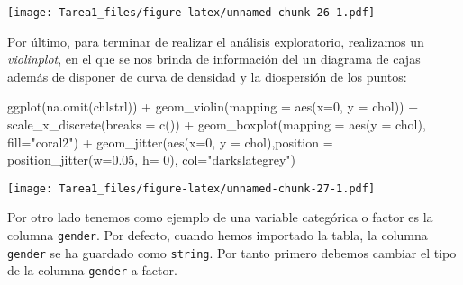 \documentclass[
]{article}
\newenvironment{Shaded}{\begin{snugshade}}{\end{snugshade}}
\newcommand{\AttributeTok}[1]{\textcolor[rgb]{0.77,0.63,0.00}{#1}}
\newcommand{\DecValTok}[1]{\textcolor[rgb]{0.00,0.00,0.81}{#1}}
\newcommand{\FloatTok}[1]{\textcolor[rgb]{0.00,0.00,0.81}{#1}}
\newcommand{\FunctionTok}[1]{\textcolor[rgb]{0.00,0.00,0.00}{#1}}
\newcommand{\NormalTok}[1]{#1}
\newcommand{\OtherTok}[1]{\textcolor[rgb]{0.56,0.35,0.01}{#1}}
\newcommand{\SpecialCharTok}[1]{\textcolor[rgb]{0.00,0.00,0.00}{#1}}
\newcommand{\StringTok}[1]{\textcolor[rgb]{0.31,0.60,0.02}{#1}}
\begin{document}
\texttt{[image: Tarea1\_files/figure-latex/unnamed-chunk-26-1.pdf]}

Por último, para terminar de realizar el análisis exploratorio,
realizamos un \emph{violinplot}, en el que se nos brinda de información
del un diagrama de cajas además de disponer de curva de densidad y la
diospersión de los puntos:

\begin{Shaded}
\begin{Highlighting}[]
\FunctionTok{ggplot}\NormalTok{(}\FunctionTok{na.omit}\NormalTok{(chlstrl)) }\SpecialCharTok{+}
  \FunctionTok{geom\_violin}\NormalTok{(}\AttributeTok{mapping =} \FunctionTok{aes}\NormalTok{(}\AttributeTok{x=}\DecValTok{0}\NormalTok{, }\AttributeTok{y =}\NormalTok{ chol)) }\SpecialCharTok{+} \FunctionTok{scale\_x\_discrete}\NormalTok{(}\AttributeTok{breaks =} \FunctionTok{c}\NormalTok{()) }\SpecialCharTok{+}
  \FunctionTok{geom\_boxplot}\NormalTok{(}\AttributeTok{mapping =} \FunctionTok{aes}\NormalTok{(}\AttributeTok{y =}\NormalTok{ chol), }\AttributeTok{fill=}\StringTok{"coral2"}\NormalTok{) }\SpecialCharTok{+}
  \FunctionTok{geom\_jitter}\NormalTok{(}\FunctionTok{aes}\NormalTok{(}\AttributeTok{x=}\DecValTok{0}\NormalTok{, }\AttributeTok{y =}\NormalTok{ chol),}\AttributeTok{position =} \FunctionTok{position\_jitter}\NormalTok{(}\AttributeTok{w=}\FloatTok{0.05}\NormalTok{, }\AttributeTok{h=} \DecValTok{0}\NormalTok{), }\AttributeTok{col=}\StringTok{"darkslategrey"}\NormalTok{)}
\end{Highlighting}
\end{Shaded}

\texttt{[image: Tarea1\_files/figure-latex/unnamed-chunk-27-1.pdf]}

Por otro lado tenemos como ejemplo de una variable categórica o factor
es la columna \texttt{gender}. Por defecto, cuando hemos importado la
tabla, la columna \texttt{gender} se ha guardado como \texttt{string}.
Por tanto primero debemos cambiar el tipo de la columna \texttt{gender}
a factor.

\begin{Shaded}
\end{Shaded}

\begin{Shaded}
\end{Shaded}
\end{document}
